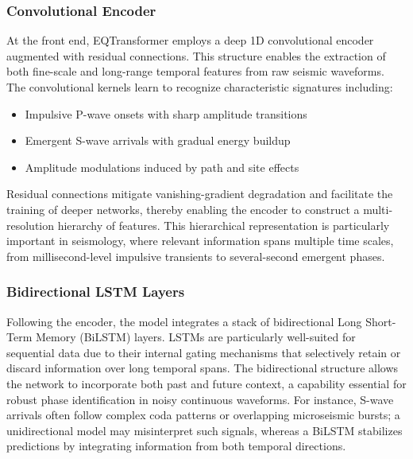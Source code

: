 \subsubsection{Convolutional Encoder}
At the front end, EQTransformer employs a deep 1D convolutional encoder
augmented with residual connections. This structure enables the extraction of
both fine-scale and long-range temporal features from raw seismic waveforms.
The convolutional kernels learn to recognize characteristic signatures
including:
\begin{itemize}
  \item Impulsive P-wave onsets with sharp amplitude transitions
  \item Emergent S-wave arrivals with gradual energy buildup
  \item Amplitude modulations induced by path and site effects
\end{itemize}

Residual connections mitigate vanishing-gradient degradation and facilitate
the training of deeper networks, thereby enabling the encoder to construct a
multi-resolution hierarchy of features. This hierarchical representation is
particularly important in seismology, where relevant information spans multiple
time scales, from millisecond-level impulsive transients to several-second
emergent phases.

\subsubsection{Bidirectional LSTM Layers}
Following the encoder, the model integrates a stack of bidirectional Long
Short-Term Memory (BiLSTM) layers. LSTMs are particularly well-suited for
sequential data due to their internal gating mechanisms that selectively
retain or discard information over long temporal spans. The bidirectional
structure allows the network to incorporate both past and future context, a
capability essential for robust phase identification in noisy continuous
waveforms. For instance, S-wave arrivals often follow complex coda patterns
or overlapping microseismic bursts; a unidirectional model may misinterpret
such signals, whereas a BiLSTM stabilizes predictions by integrating
information from both temporal directions.

